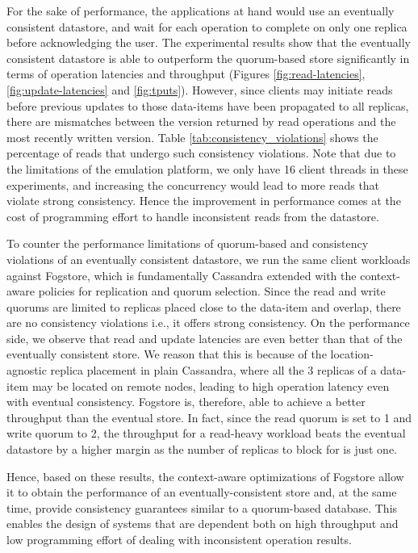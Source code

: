 \par For the sake of performance, the applications at hand would use an eventually consistent datastore, and wait for each operation to complete on only one replica before acknowledging the user. The experimental results show that the eventually consistent datastore is able to outperform the quorum-based store significantly in terms of operation latencies and throughput (Figures \ref{fig:read-latencies}, \ref{fig:update-latencies} and \ref{fig:tputs}). However, since clients may initiate reads before previous updates to those data-items have been propagated to all replicas, there are mismatches between the version returned by read operations and the most recently written version. Table \ref{tab:consistency_violations} shows the percentage of reads that undergo such consistency violations. Note that due to the limitations of the emulation platform, we only have 16 client threads in these experiments, and increasing the concurrency would lead to more reads that violate strong consistency. Hence the improvement in performance comes at the cost of programming effort to handle inconsistent reads from the datastore. 
\par To counter the performance limitations of quorum-based and consistency violations of an eventually consistent  datastore, we run the same client workloads against Fogstore, which is fundamentally Cassandra extended with the context-aware policies for replication and quorum selection. Since the read and write quorums are limited to replicas placed close to the data-item and overlap, there are no consistency violations i.e., it offers strong consistency. On the performance side, we observe that read and update latencies are even better than that of the eventually consistent store. We reason that this is because of the location-agnostic replica placement in plain Cassandra, where all the 3 replicas of a data-item may be located on remote nodes, leading to high operation latency even with eventual consistency. Fogstore is, therefore, able to achieve a better throughput than the eventual store. In fact, since the read quorum is set to 1 and write quorum to 2, the throughput for a read-heavy workload beats the eventual datastore by a higher margin as the number of replicas to block for is just one.

\par Hence, based on these results, the context-aware optimizations of Fogstore allow it to obtain the performance of an eventually-consistent store and, at the same time, provide consistency guarantees similar to a quorum-based database. This enables the design of systems that are dependent both on high throughput and low programming effort of dealing with inconsistent operation results.

